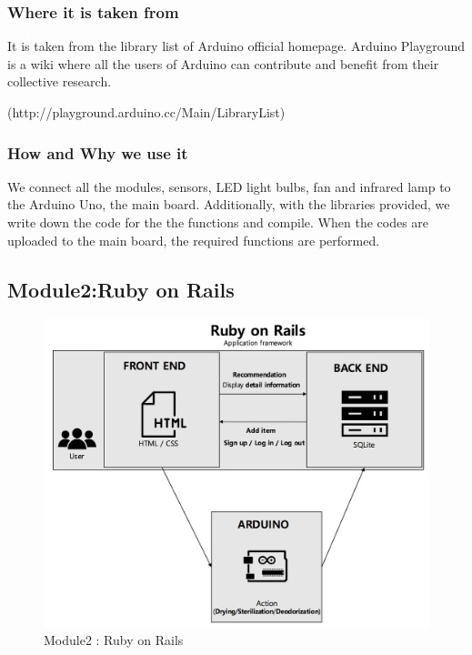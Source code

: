 \documentclass[conference]{IEEEtran}
\begin{document}
\subsubsection{Where it is taken from} It is taken from the library list of Arduino official homepage. Arduino Playground is a wiki where all the users of Arduino can contribute and benefit from their collective research.

(http://playground.arduino.cc/Main/LibraryList)
\subsubsection{How and Why we use it}We connect all the modules, sensors, LED light bulbs, fan and infrared lamp to the Arduino Uno, the main board. Additionally, with the libraries provided, we write down the code for the the functions and compile. When the codes are uploaded to the main board, the required functions are performed.\\

\subsection{Module2:Ruby on Rails}
\begin{figure}[h]
\begin{center}
    \includegraphics[scale=0.33]{module2}
    \caption{Module2 : Ruby on Rails} \label{fig:label}
\end{center}
\end{figure}
\end{document}
